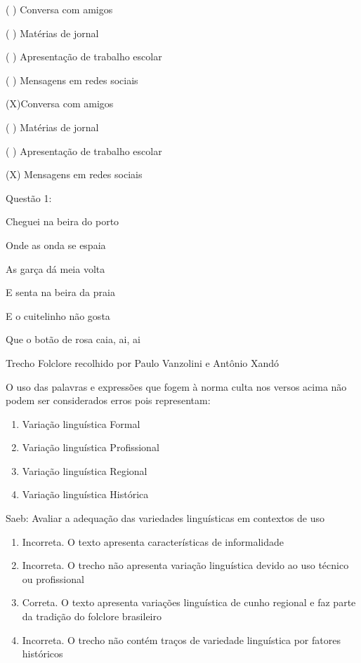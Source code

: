 {( ) Conversa com amigos

( ) Matérias de jornal

( ) Apresentação de trabalho escolar

( ) Mensagens em redes sociais

(X)Conversa com amigos

( ) Matérias de jornal

( ) Apresentação de trabalho escolar

(X) Mensagens em redes sociais


Questão 1:

Cheguei na beira do porto

Onde as onda se espaia

As garça dá meia volta

E senta na beira da praia

E o cuitelinho não gosta

Que o botão de rosa caia, ai, ai

Trecho Folclore recolhido por Paulo Vanzolini e Antônio Xandó

O uso das palavras e expressões que fogem à norma culta nos versos acima
não podem ser considerados erros pois representam:

\begin{enumerate}
\def\labelenumi{\alph{enumi})}
\item
  Variação linguística Formal
\item
  Variação linguística Profissional
\item
  Variação linguística Regional
\item
  Variação linguística Histórica
\end{enumerate}

Saeb: Avaliar a adequação das variedades linguísticas em contextos de
uso

\begin{enumerate}
\def\labelenumi{\arabic{enumi}.}
\item
  Incorreta. O texto apresenta características de informalidade
\item
  Incorreta. O trecho não apresenta variação linguística devido ao uso
  técnico ou profissional
\item
  Correta. O texto apresenta variações linguística de cunho regional e
  faz parte da tradição do folclore brasileiro
\item
  Incorreta. O trecho não contém traços de variedade linguística por
  fatores históricos
\end{enumerate}

}
